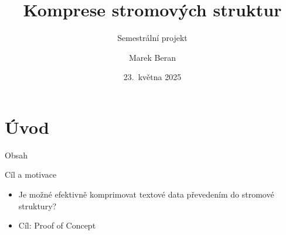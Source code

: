 \documentclass[lualatex,hyperref={pdfencoding=auto}]{beamer}
\title[Komprese stromových struktur]{Komprese stromových struktur}
\subtitle{Semestrální projekt}
\author{Marek Beran}
\institute[VŠB-TUO]{VŠB -- Technická univerzita Ostrava\\\vspace{2mm}marek.beran.st@vsb.cz}
\date[23.~5.~2025]{23.~května 2025}
\begin{document}
\section{Úvod}

\begin{frame}{Obsah}
    \tableofcontents
\end{frame}

\begin{frame}{Cíl a motivace}

\begin{itemize}
    \item Je možné efektivně komprimovat textové data převedením do stromové struktury?
    \item Cíl: Proof of Concept
\end{itemize}
\end{frame}
\end{document}
